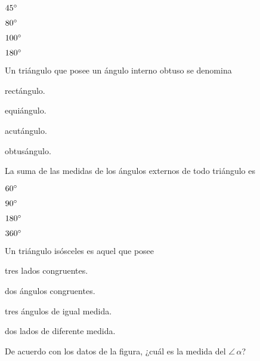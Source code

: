 \documentclass[12pt, fleqn]{article}
\begin{document}
\benu
\item[] \opc $45^\circ$\vf
\item[] \opc $80^\circ$\vf
\item[] \opc $100^\circ$\vf
\item[] \opc $180^\circ$
\eenu
\vs

\item Un triángulo que posee un ángulo interno obtuso se denomina \vp

\benu
\item[] \opc rectángulo. \vf
\item[] \opc equiángulo. \vf
\item[] \opc acutángulo. \vf
\item[] \opc obtusángulo.
\eenu
\vs

\item La suma de las medidas de los ángulos externos de todo triángulo es \vp

\benu
\item[] \opc $60^\circ$ \vf
\item[] \opc $90^\circ$ \vf
\item[] \opc $180^\circ$ \vf
\item[] \opc $360^\circ$
\eenu\vs

\item Un triángulo isósceles es aquel que posee \vp

\benu
\item[] \opc tres lados congruentes. \vf
\item[] \opc dos ángulos congruentes. \vf
\item[] \opc tres ángulos de igual medida. \vf
\item[] \opc dos lados de diferente medida.
\eenu

\pagebreak

\item De acuerdo con los datos de la figura, ¿cuál es la medida del $\angle\,\alpha$?
\vspace{-2mm}
\end{document}
